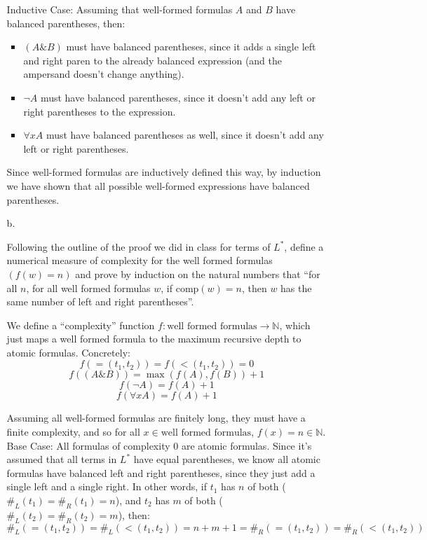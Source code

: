 \begin{enumerate}
\begin{enumerate}
        Inductive Case: Assuming that well-formed formulas $A$ and $B$ have balanced parentheses, then:\\
        \begin{itemize}
          \item $(A\&B)$ must have balanced parentheses, since it adds a single left and right paren to the already balanced expression (and the ampersand doesn't change anything).
          \item $\neg A$ must have balanced parentheses, since it doesn't add any left or right parentheses to the expression.
          \item $\forall x A$ must have balanced parentheses as well, since it doesn't add any left or right parentheses.
        \end{itemize}

         Since well-formed formulas are inductively defined this way, by induction we have shown that all possible well-formed expressions have balanced parentheses.
        
      \item [b.]
        \begin{question}
          Following the outline of the proof we did in class for terms of $L^*$, define a numerical measure of complexity for the well formed formulas $(f(w) = n)$ and prove by induction on the natural numbers that ``for all $n$, for all well formed formulas $w$, if $\text{comp}(w) = n$, then $w$ has the same number of left and right parentheses''.\\
        \end{question}

        We define a ``complexity'' function $f: \text{well formed formulas} \rightarrow \mathds{N}$, which just maps a well formed formula to the maximum recursive depth to atomic formulas. Concretely:
        $$f(=(t_1,t_2)) = f(<(t_1,t_2)) = 0$$ 
        $$f((A\&B)) = \max(f(A), f(B)) + 1$$
        $$f(\neg A) = f(A) + 1$$
        $$f(\forall x A) = f(A) + 1$$

        Assuming all well-formed formulas are finitely long, they must have a finite complexity, and so for all $x \in \text{well formed formulas}$, $f(x) = n \in \mathds{N}$.\\

        Base Case: All formulas of complexity 0 are atomic formulas. Since it's assumed that all terms in $L^*$ have equal parentheses, we know all atomic formulas have balanced left and right parentheses, since they just add a single left and a single right. In other words, if $t_1$ has $n$ of both ($\#_L(t_1) = \#_R(t_1) = n$), and $t_2$ has $m$ of both ($\#_L(t_2) = \#_R(t_2) = m$), then:
        $$\#_L(=(t_1,t_2)) = \#_L(<(t_1,t_2)) = n + m + 1 = \#_R(=(t_1,t_2)) = \#_R(<(t_1,t_2))$$


\end{enumerate}
\end{enumerate}
